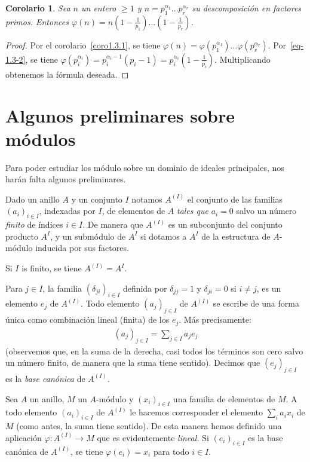\documentclass[oneside,bibtotoc,leqno,spanish]{amsbook}
\renewcommand{\to}[1][]{\xrightarrow{#1}}
\numberwithin{equation}{section}
\theoremstyle{defi}
\theoremstyle{note}
\newtheorem{corollary}{Corolario}
\theoremstyle{rem}
\numberwithin{theorem}{section}
\numberwithin{proposition}{section}
\numberwithin{definition}{section}
\numberwithin{lemma}{section}
\numberwithin{corollary}{section}
\numberwithin{example}{section}
\numberwithin{footnote}{section}%
\begin{document}
\begin{corollary}
Sea $n$ un entero $\geq 1$ y $n = p_{1}^{\alpha_{1}}\dots p_{r}^{\alpha_{r}}$ su
descomposici\'on
en factores primos. Entonces
$\varphi(n) = n\left(1-\frac{1}{p_{1}}\right)\dots\left(1-\frac{1}{p_{r}}\right)$.
\end{corollary}

\begin{proof}
Por el corolario~\ref{coro1.3.1}, se tiene
$\varphi(n) = \varphi(p_{1}^{\alpha_{1}})\dots\varphi(p_{r}^{\alpha_{r}})$.
Por~\eqref{eq-1.3-2}, se tiene $\varphi(p_{i}^{\alpha_{i}}) = p_{i}^{\alpha_{i}-1}(p_{i}-1)
=p_{i}^{\alpha_{i}}\left(1-\frac{1}{p_{i}}\right)$. Multiplicando obtenemos
la f\'ormula deseada.
\end{proof}

\section{Algunos preliminares sobre m\'odulos}\label{sec1.4}

Para poder estudiar los m\'odulo sobre un dominio de ideales principales, nos har\'an
falta algunos preliminares.

Dado un anillo $A$ y un conjunto $I$ notamos $A^{(I)}$ el conjunto de las
familias $(a_{i})_{i\in I}$,
indexadas por $I$, de elementos de $A$ {\em tales que} $a_{i} = 0$ salvo un
n\'umero {\em finito} de \'indices
$i\in I$. De manera que $A^{(I)}$ es un subconjunto del conjunto producto $A^{I}$,
y un subm\'odulo de $A^{I}$ si
dotamos a $A^{I}$ de la estructura de $A$-m\'odulo inducida por sus factores.

Si $I$ is finito, se tiene $A^{(I)} = A^{I}$.

Para $j\in I$, la familia $(\delta_{ji})_{i\in I}$ definida por
$\delta_{jj} = 1$ y $\delta_{ji} = 0$ si
$i\neq j$, es un elemento $e_{j}$ de $A^{(I)}$. Todo elemento $(a_{j})_{j\in I}$
de $A^{(I)}$ se escribe
de una forma \'unica como combinaci\'on lineal (finita) de los $e_{j}$. M\'as precisamente:
\begin{gather}
(a_{j})_{j\in I} = \sum_{j\in I}a_{j}e_{j}
\end{gather}
(observemos que, en la suma de la derecha, casi todos los t\'erminos son cero salvo un
n\'umero finito, de manera
que la suma tiene sentido). Decimos que $(e_{j})_{j\in I}$ es la
{\em base can\'onica} de $A^{(I)}$.

Sea $A$ un anillo, $M$ un $A$-m\'odulo y $(x_{i})_{i\in I}$ una familia de elementos
de $M$. A todo elemento
$(a_{i})_{i\in I}$ de $A^{(I)}$ le hacemos corresponder el elemento $\sum_{i}a_{i}x_{i}$
de $M$ (como antes, la
suma tiene sentido). De esta manera hemos definido una aplicaci\'on
$\varphi:A^{(I)}\to M$ que es evidentemente
{\em lineal.} Si $(e_{i})_{i\in I}$ es la base can\'onica de $A^{(I)}$, se
tiene $\varphi(e_{i}) = x_{i}$ para todo
$i\in I$.
\end{document}

